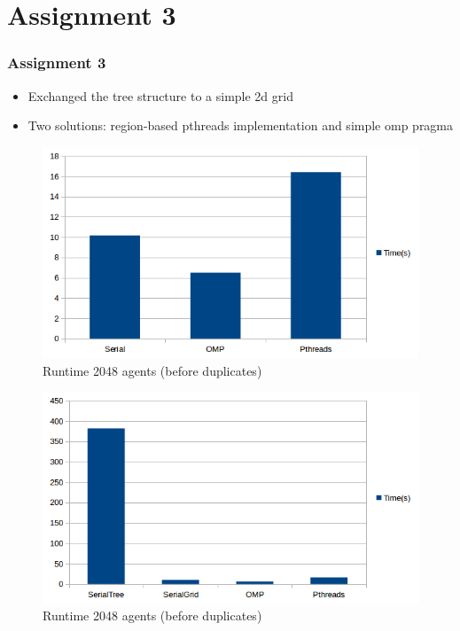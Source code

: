 \documentclass{beamer}
\begin{document}
\section{Assignment 3}
\begin{frame}
	\frametitle{Assignment 3}
	\begin{itemize}
	\item
	Exchanged the tree structure to a simple 2d grid
	\item
	Two solutions: region-based pthreads implementation and simple omp pragma
	\end{itemize}
\end{frame}

\begin{frame}
	\begin{figure}[h!]
	\includegraphics[width=\textwidth]{lab3graph1.png}
	\caption{Runtime 2048 agents (before duplicates)}
	\end{figure}
\end{frame}

\begin{frame}
	\begin{figure}[h!]
	\includegraphics[width=\textwidth]{lab3graph2.png}
	\caption{Runtime 2048 agents (before duplicates)}
	\end{figure}
\end{frame}
\end{document}
